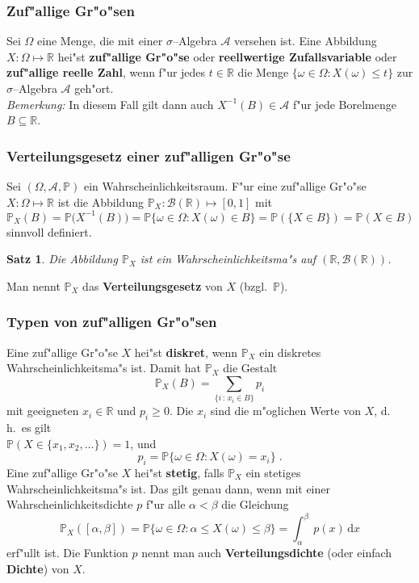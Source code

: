 \documentclass[ngerman,draft,parskip=half,twoside]{scrartcl}
\newtheorem{thm}{Satz}[section]
\newcommand*{\R}{\mathbb{R}}      %
\newcommand*{\Algeb}{\mathcal{A}}   %
\newcommand*{\BorelM}{\mathcal{B}}  %
\newcommand*{\WKM}{\mathbb{P}}      %
\begin{document}
\subsubsection{Zuf"allige Gr"o"sen}
Sei $\Omega$ eine Menge, die mit einer $\sigma$--Algebra $\Algeb$ versehen ist. Eine Abbildung
$X\colon\Omega\mapsto\R$ hei"st \textbf{zuf"allige Gr"o"se} oder \textbf{reellwertige Zufallsvariable}
oder \textbf{zuf"allige reelle Zahl}, wenn f"ur jedes $t\in\R$ die Menge $\{\omega\in\Omega: X(\omega)\le t\}$
zur $\sigma$--Algebra $\Algeb$ geh"ort.\\
\textit{Bemerkung:} In diesem Fall gilt dann auch $X^{-1}(B)\in\Algeb$ f"ur jede Borelmenge $B\subseteq \R$.

\subsubsection{Verteilungsgesetz einer zuf"alligen Gr"o"se}
Sei $(\Omega,\Algeb,\WKM)$ ein Wahrscheinlichkeitsraum.
F"ur eine zuf"allige Gr"o"se $X\colon\Omega\mapsto\R$ ist die Abbildung
$\WKM_X \colon \BorelM(\R)\mapsto [0,1]$ mit
$$
\WKM_X(B)=\WKM\big(X^{-1}(B)\big)=\WKM\{\omega\in\Omega : X(\omega)\in B\}=\WKM(\{X\in B\})= \WKM(X\in B)
$$
sinnvoll definiert.
\begin{thm}
Die Abbildung $\WKM_X$ ist ein Wahrscheinlichkeitsma"s auf $(\R,\BorelM(\R))$.
\end{thm}
Man nennt $\WKM_X$ das \textbf{Verteilungsgesetz} von $X$ (bzgl.~$\WKM$).
\subsubsection{Typen von zuf"alligen Gr"o"sen}
Eine zuf"allige Gr"o"se $X$ hei"st \textbf{diskret}, wenn $\WKM_X$ ein diskretes
Wahrscheinlichkeitsma"s ist. Damit hat $\WKM_X$ die Gestalt
$$
\WKM_X(B)=\sum_{\{i\, : \,x_i\in  B\}} p_i
$$
mit geeigneten $x_i\in\R$ und $p_i\ge 0$. Die $x_i$ sind die m"oglichen Werte von $X$, d.\,h.~es
gilt\\ $\WKM(X\in\{x_1,x_2,\ldots\})=1$,
und
$$
p_i=\WKM\{\omega\in\Omega : X(\omega)=x_i\}\;.
$$
Eine zuf"allige Gr"o"se $X$ hei"st \textbf{stetig}, falls $\WKM_X$ ein stetiges Wahrscheinlichkeitsma"s
ist. Das gilt genau dann, wenn mit einer Wahrscheinlichkeitsdichte $p$ f"ur alle $\alpha<\beta$
die Gleichung
$$
\WKM_X([\alpha,\beta])=\WKM\{\omega\in\Omega : \alpha\le X(\omega)\le\beta\}=\int_\alpha^\beta\,p(x)\,
\mathrm d x
$$
erf"ullt ist. Die Funktion $p$ nennt man auch \textbf{Verteilungsdichte} (oder einfach
\textbf{Dichte}) von $X$.
\end{document}
